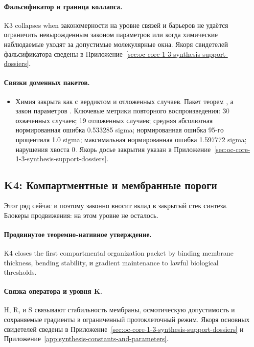 \paragraph{Фальсификатор и граница коллапса.}
K3 collapses when закономерности на уровне связей и барьеров не удаётся ограничить невырожденным законом параметров или когда химические наблюдаемые уходят за допустимые молекулярные окна.
Якоря свидетелей фальсификатора сведены в Приложение~\ref{sec:oc-core-1-3-synthesis-support-dossiers}.

\paragraph{Связки доменных пакетов.}
\begin{itemize}[leftmargin=1.6em,nosep]
\item Химия закрыта как  с вердиктом  и  отложенных случаев. Пакет теорем , а закон параметров . Ключевые метрики повторного воспроизведения: 30 охваченных случаев; 19 отложенных случаев; средняя абсолютная нормированная ошибка 0.533285 sigma; нормированная ошибка 95-го процентиля 1.0 sigma; максимальная нормированная ошибка 1.597772 sigma; нарушения хвоста 0. Якорь досье закрытия указан в Приложение~\ref{sec:oc-core-1-3-synthesis-support-dossiers}.
\end{itemize}

\subsection{K4: Компартментные и мембранные пороги}
\label{sec:oc-core-1-3-synthesis-k4}
Этот ряд сейчас  и поэтому законно вносит вклад в закрытый стек синтеза.
Блокеры продвижения: на этом уровне не осталось.

\paragraph{Продвинутое теоремно-нативное утверждение.}
K4 closes the first compartmental organization packet by binding membrane thickness, bending stability, и gradient maintenance to lawful biological thresholds.

\paragraph{Связка оператора и уровня K.}
H, R, и S связывают стабильность мембраны, осмотическую допустимость и сохраняемые градиенты в ограниченный протоклеточный режим.
Якоря основных свидетелей сведены в Приложение~\ref{sec:oc-core-1-3-synthesis-support-dossiers} и Приложение~\ref{app:synthesis-constants-and-parameters}.

